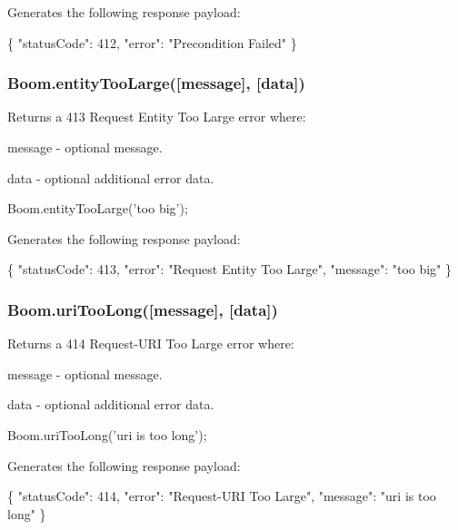 Generates the following response payload\+:


\begin{DoxyCode}
\{
    "statusCode": 412,
    "error": "Precondition Failed"
\}
\end{DoxyCode}


\subsubsection*{{\ttfamily Boom.\+entity\+Too\+Large(\mbox{[}message\mbox{]}, \mbox{[}data\mbox{]})}}

Returns a 413 Request Entity Too Large error where\+:
\begin{DoxyItemize}
\item {\ttfamily message} -\/ optional message.
\item {\ttfamily data} -\/ optional additional error data.
\end{DoxyItemize}


\begin{DoxyCode}
Boom.entityTooLarge('too big');
\end{DoxyCode}


Generates the following response payload\+:


\begin{DoxyCode}
\{
    "statusCode": 413,
    "error": "Request Entity Too Large",
    "message": "too big"
\}
\end{DoxyCode}


\subsubsection*{{\ttfamily Boom.\+uri\+Too\+Long(\mbox{[}message\mbox{]}, \mbox{[}data\mbox{]})}}

Returns a 414 Request-\/\+U\+RI Too Large error where\+:
\begin{DoxyItemize}
\item {\ttfamily message} -\/ optional message.
\item {\ttfamily data} -\/ optional additional error data.
\end{DoxyItemize}


\begin{DoxyCode}
Boom.uriTooLong('uri is too long');
\end{DoxyCode}


Generates the following response payload\+:


\begin{DoxyCode}
\{
    "statusCode": 414,
    "error": "Request-URI Too Large",
    "message": "uri is too long"
\}
\end{DoxyCode}


